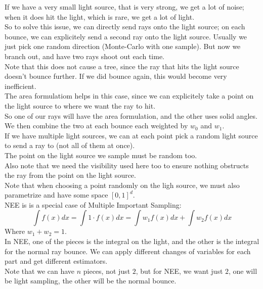 \documentclass[12pt]{article}
\begin{document}
If we have a very small light source, that is very
strong, we get a lot of noise; when it does
hit the light, which is rare, we get a lot of light. \\

So to solve this issue, we can directly send rays
onto the light source; on each bounce,
we can explicitely send a second ray onto
the light source. Usually we just pick one
random direction (Monte-Carlo with one sample).
But now we branch out, and have two rays
shoot out each time. \\

Note that this does not cause a tree,
since the ray that hits the light source
doesn't bounce further.
If we did bounce again, this would
become very inefficient. \\

The area formulatiom helps in this case,
since we can explicitely take a point on the
light source to where we want the ray
to hit. \\

So one of our rays will have the area formulation,
and the other uses solid angles.
We then combine the two at each bounce
each weighted by $w_0$ and $w_1$. \\

If we have multiple light sources,
we can at each point pick a random light
source to send a ray to (not all of them
at once). \\

The point on the light source we sample
must be random too. \\
Also note that we need the visibility used
here too to ensure nothing obstructs the
ray from the point on the light source. \\

Note that when choosing a point randomly
on the ligh source, we must also parametrize
and have some space $[0, 1]^d$. \\

NEE is is a special case of Multiple Important
Sampling:
\[ \int f(x)dx = \int 1 \cdot f(x) dx 
= \int w_1 f(x) dx + \int w_2 f(x) dx \]
Where $w_1 + w_2 = 1$. \\
In NEE, one of the pieces is the integral
on the light, and the other is the integral
for the normal ray bounce.
We can apply different changes of variables
for each part and get different estimators. \\
Note that we can have $n$ pieces,
not just $2$, but for NEE, we want just $2$,
one will be light sampling, the other will
be the normal bounce. \\
\end{document}

